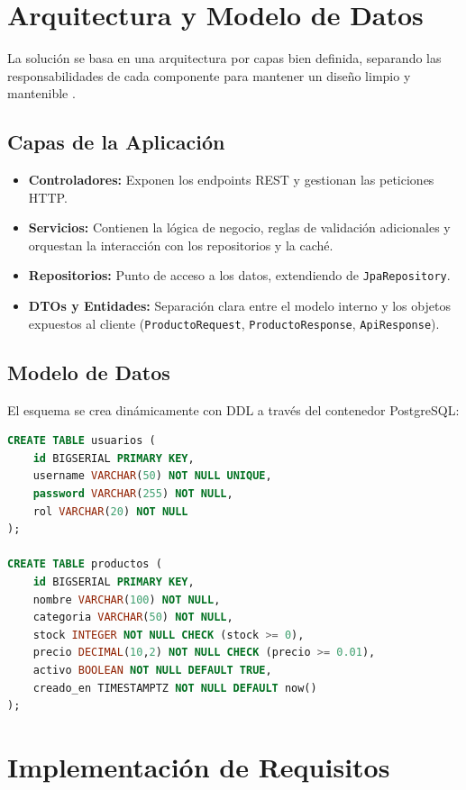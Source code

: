 \documentclass[12pt]{article}
\begin{document}
\section{Arquitectura y Modelo de Datos}
La solución se basa en una arquitectura por capas bien definida, separando las responsabilidades de cada componente para mantener un diseño limpio y mantenible \cite{cleanarch}. 

\subsection{Capas de la Aplicación}
\begin{itemize}
    \item \textbf{Controladores:} Exponen los endpoints REST y gestionan las peticiones HTTP. 
    \item \textbf{Servicios:} Contienen la lógica de negocio, reglas de validación adicionales y orquestan la interacción con los repositorios y la caché.
    \item \textbf{Repositorios:} Punto de acceso a los datos, extendiendo de \texttt{JpaRepository}.
    \item \textbf{DTOs y Entidades:} Separación clara entre el modelo interno y los objetos expuestos al cliente (\texttt{ProductoRequest}, \texttt{ProductoResponse}, \texttt{ApiResponse}).
\end{itemize}

\subsection{Modelo de Datos}
El esquema se crea dinámicamente con DDL a través del contenedor PostgreSQL:

\begin{lstlisting}[language=SQL, caption=Esquema de base de datos]
CREATE TABLE usuarios (
    id BIGSERIAL PRIMARY KEY,
    username VARCHAR(50) NOT NULL UNIQUE,
    password VARCHAR(255) NOT NULL,
    rol VARCHAR(20) NOT NULL
);

CREATE TABLE productos (
    id BIGSERIAL PRIMARY KEY,
    nombre VARCHAR(100) NOT NULL,
    categoria VARCHAR(50) NOT NULL,
    stock INTEGER NOT NULL CHECK (stock >= 0),
    precio DECIMAL(10,2) NOT NULL CHECK (precio >= 0.01),
    activo BOOLEAN NOT NULL DEFAULT TRUE,
    creado_en TIMESTAMPTZ NOT NULL DEFAULT now()
);
\end{lstlisting}

\section{Implementación de Requisitos}
\end{document}
